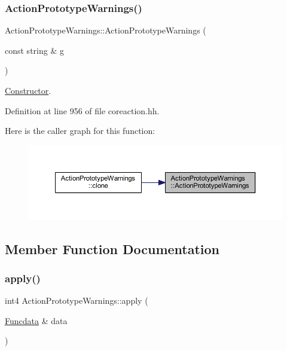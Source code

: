 \subsubsection{\texorpdfstring{ActionPrototypeWarnings()}{ActionPrototypeWarnings()}}
{\footnotesize\ttfamily Action\+Prototype\+Warnings\+::\+Action\+Prototype\+Warnings (\begin{DoxyParamCaption}\item[{const string \&}]{g }\end{DoxyParamCaption})\hspace{0.3cm}{\ttfamily [inline]}}



\mbox{\hyperlink{class_constructor}{Constructor}}. 



Definition at line 956 of file coreaction.\+hh.

Here is the caller graph for this function\+:
\nopagebreak
\begin{figure}[H]
\begin{center}
\leavevmode
\includegraphics[width=350pt]{class_action_prototype_warnings_ab64278c34e15df9a8f1fdbe74ab10034_icgraph}
\end{center}
\end{figure}


\subsection{Member Function Documentation}
\mbox{\label{class_action_prototype_warnings_a6f52b3f6147c5baac2d7a27c90234001}} 
\subsubsection{\texorpdfstring{apply()}{apply()}}
{\footnotesize\ttfamily int4 Action\+Prototype\+Warnings\+::apply (\begin{DoxyParamCaption}\item[{\mbox{\hyperlink{class_funcdata}{Funcdata}} \&}]{data }\end{DoxyParamCaption})\hspace{0.3cm}{\ttfamily [virtual]}}



